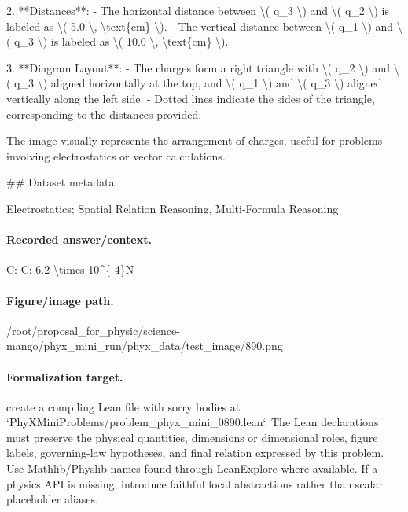 2. **Distances**:
   - The horizontal distance between \textbackslash{}( q\_3 \textbackslash{}) and \textbackslash{}( q\_2 \textbackslash{}) is labeled as \textbackslash{}( 5.0 \textbackslash{}, \textbackslash{}text\{cm\} \textbackslash{}).
   - The vertical distance between \textbackslash{}( q\_1 \textbackslash{}) and \textbackslash{}( q\_3 \textbackslash{}) is labeled as \textbackslash{}( 10.0 \textbackslash{}, \textbackslash{}text\{cm\} \textbackslash{}).

3. **Diagram Layout**:
   - The charges form a right triangle with \textbackslash{}( q\_2 \textbackslash{}) and \textbackslash{}( q\_3 \textbackslash{}) aligned horizontally at the top, and \textbackslash{}( q\_1 \textbackslash{}) and \textbackslash{}( q\_3 \textbackslash{}) aligned vertically along the left side.
   - Dotted lines indicate the sides of the triangle, corresponding to the distances provided.

The image visually represents the arrangement of charges, useful for problems involving electrostatics or vector calculations.

\#\# Dataset metadata

Electrostatics; Spatial Relation Reasoning, Multi-Formula Reasoning

\paragraph{Recorded answer/context.}
C: C: 6.2 \textbackslash{}times 10\textasciicircum{}\{-4\}N

\paragraph{Figure/image path.}
/root/proposal\_for\_physic/science-mango/phyx\_mini\_run/phyx\_data/test\_image/890.png

\paragraph{Formalization target.}
create a compiling Lean file with sorry bodies at `PhyXMiniProblems/problem\_phyx\_mini\_0890.lean`. The Lean declarations must preserve the physical quantities, dimensions or dimensional roles, figure labels, governing-law hypotheses, and final relation expressed by this problem.
Use Mathlib/Physlib names found through LeanExplore where available. If a physics API is missing, introduce faithful local abstractions rather than scalar placeholder aliases.


